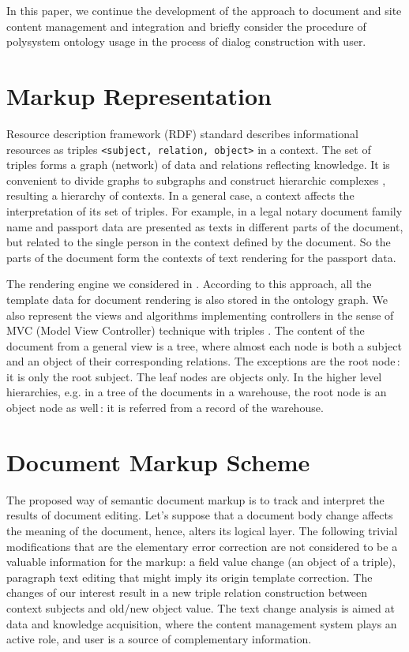 \documentclass[conference]{IEEEtran}
\begin{document}
In this paper, we continue the development of the approach to document
and site content management and integration \cite{prevwork} and
briefly consider the procedure of polysystem ontology usage in the
process of dialog construction with user.

\section{Markup Representation}

Resource description framework (RDF) standard describes informational
resources as triples \texttt{<subject, relation, object>} in a
context.  The set of triples forms a graph (network) of data and
relations reflecting knowledge.  It is convenient to divide graphs to
subgraphs and construct hierarchic complexes \cite{b4}, resulting a
hierarchy of contexts.  In a general case, a context affects the
interpretation of its set of triples.  For example, in a legal notary
document family name and passport data are presented as texts in
different parts of the document, but related to the single person in
the context defined by the document.  So the parts of the document
form the contexts of text rendering for the passport data.

The rendering engine we considered in \cite{prevwork}.  According to
this approach, all the template data for document rendering is also
stored in the ontology graph.  We also represent the views and
algorithms implementing controllers in the sense of MVC (Model View
Controller) \cite{b2:5} technique with triples \cite{b5}.  The content
of the document from a general view is a tree, where almost each node
is both a subject and an object of their corresponding relations.  The
exceptions are the root node\,: it is only the root subject.  The leaf
nodes are objects only.  In the higher level hierarchies, e.g. in a
tree of the documents in a warehouse, the root node is an object node
as well\,: it is referred from a record of the warehouse.

\section{Document Markup Scheme}
\label{sec:scheme}

The proposed way of semantic document markup is to track and interpret
the results of document editing.  Let's suppose that a document body
change affects the meaning of the document, hence, alters its logical
layer.  The following trivial modifications that are the elementary
error correction are not considered to be a valuable information for
the markup: a field value change (an object of a triple), paragraph
text editing that might imply its origin template correction.  The
changes of our interest result in a new triple relation construction
between context subjects and old/new object value.  The text change
analysis is aimed at data and knowledge acquisition, where the content
management system plays an active role, and user is a source of
complementary information.
\end{document}
